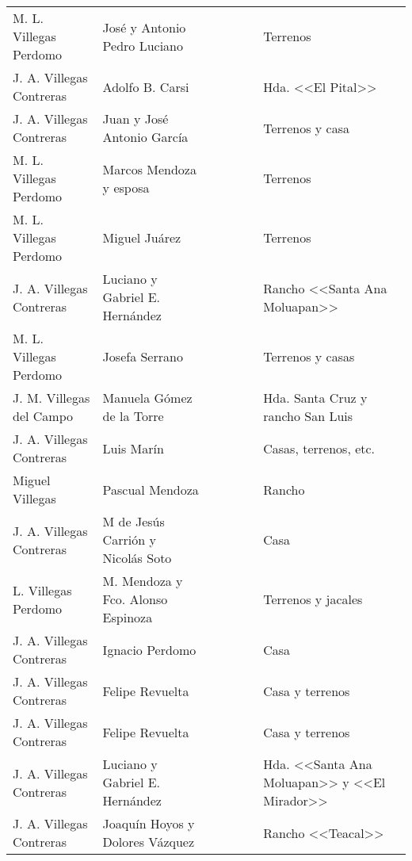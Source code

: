 \documentclass[14pt,twoside,final]{extbook} %
\begin{document}
{\begin{longtable}[c]{@{}p{2.5cm}lrSrrl@{}}
M. L. Villegas Perdomo & José y Antonio Pedro Luciano &  & {} & {} & {} & Terrenos \\
J. A. Villegas Contreras & Adolfo B. Carsi &  &  &  &  & Hda. <<El Pital>> \\
J. A. Villegas Contreras & Juan y José Antonio García &  &  &  &  & Terrenos y casa \\
M. L. Villegas Perdomo & Marcos Mendoza y esposa &  &  & {} & {} & Terrenos \\
M. L. Villegas Perdomo & Miguel Juárez &  & {} & {} & {} & Terrenos \\
J. A. Villegas Contreras & Luciano y Gabriel E. Hernández &  &  &  &  & Rancho <<Santa Ana Moluapan>> \\
M. L. Villegas Perdomo & Josefa Serrano &  &  & {} & {} & Terrenos y casas \\
J. M. Villegas del Campo & Manuela Gómez de la Torre &  &  &  &  & Hda. Santa Cruz y rancho San Luis \\
J. A. Villegas Contreras & Luis Marín &  &  &  &  & Casas, terrenos, etc. \\
Miguel Villegas & Pascual Mendoza &  &  & {} & {} & Rancho \\
J. A. Villegas Contreras & M de Jesús Carrión y Nicolás Soto &  &  & {} & {} & Casa \\
L. Villegas Perdomo & M. Mendoza y Fco. Alonso Espinoza &  & {} & {} & {} & Terrenos y jacales \\
J. A. Villegas Contreras & Ignacio Perdomo &  &  &  &  & Casa \\
J. A. Villegas Contreras & Felipe Revuelta &  &  &  &  & Casa y terrenos \\
J. A. Villegas Contreras & Felipe Revuelta &  &  &  &  & Casa y terrenos \\
J. A. Villegas Contreras & Luciano y Gabriel E. Hernández &  &  &  &  & Hda. <<Santa Ana Moluapan>> y <<El Mirador>> \\
J. A. Villegas Contreras & Joaquín Hoyos y Dolores Vázquez &  &  & {} & {} & Rancho <<Teacal>> \\

\end{longtable}}
\end{document}
